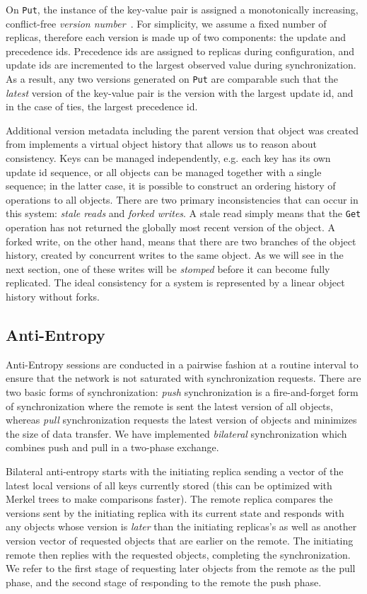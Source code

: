 On \texttt{Put}, the instance of the key-value pair is assigned a
monotonically increasing, conflict-free \textit{version
number}~\cite{almeida_version_2002}.
For simplicity, we assume a fixed number of replicas, therefore each version
is made up of two components: the update and precedence ids.
Precedence ids are assigned to replicas during configuration, and update ids
are incremented to the largest observed value during synchronization.
As a result, any two versions generated on \texttt{Put} are comparable such
that the \textit{latest} version of the key-value pair is the version with the
largest update id, and in the case of ties, the largest precedence id.

Additional version metadata including the parent version that object was
created from implements a virtual object history that allows us to reason
about consistency.
Keys can be managed independently, e.g. each key has its own update id
sequence, or all objects can be managed together with a single sequence; in
the latter case, it is possible to construct an ordering history of
operations to all objects.
There are two primary inconsistencies that can occur in this system:
\textit{stale reads} and \textit{forked writes}.
A stale read simply means that the \texttt{Get} operation has not returned
the globally most recent version of the object.
A forked write, on the other hand, means that there are two branches of the
object history, created by concurrent writes to the same object.
As we will see in the next section, one of these writes will be
\textit{stomped} before it can become fully replicated.
The ideal consistency for a system is represented by a linear object history
without forks.

\subsection*{Anti-Entropy}

Anti-Entropy sessions are conducted in a pairwise fashion at a routine
interval to ensure that the network is not saturated with synchronization
requests.
There are two basic forms of synchronization: \textit{push} synchronization
is a fire-and-forget form of synchronization where the remote is sent the
latest version of all objects, whereas \textit{pull} synchronization requests
the latest version of objects and minimizes the size of data transfer.
We have implemented \textit{bilateral} synchronization which combines push
and pull in a two-phase exchange.

Bilateral anti-entropy starts with the initiating replica sending a vector of
the latest local versions of all keys currently stored (this can be optimized
with Merkel trees to make comparisons faster).
The remote replica compares the versions sent by the initiating replica with
its current state and responds with any objects whose version is \textit{later} than
the initiating replicas's as well as another version vector of requested
objects that are earlier on the remote.
The initiating remote then replies with the requested objects, completing the
synchronization.
We refer to the first stage of requesting later objects from the remote as
the pull phase, and the second stage of responding to the remote the push
phase.

